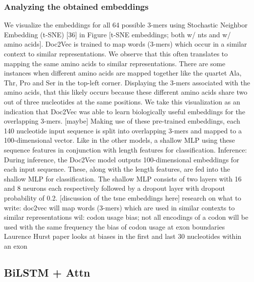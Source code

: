 \subsubsection{Analyzing the obtained embeddings}
We visualize the embeddings for all 64 possible 3-mers using Stochastic Neighbor Embedding (t-SNE) [36] in Figure [t-SNE embeddings; both w/ nts and w/ amino acids].
Doc2Vec is trained to map words (3-mers) which occur in a similar context to similar representations. We observe that this often translates to mapping the same amino acids to similar representations. There are some instances when different amino acids are mapped together like the quartet Ala, Thr, Pro and Ser in the top-left corner. Displaying the 3-mers associated with the amino acids, that this likely occurs because these different amino acids share two out of three nucleotides at the same positions. We take this visualization as an indication that Doc2Vec was able to learn biologically useful embeddings for the overlapping 3-mers.
[maybe] Making use of these pre-trained embeddings, each 140 nucleotide input sequence is split into overlapping 3-mers and mapped to a 100-dimensional vector. Like in the other models, a shallow MLP using these sequence features in conjunction with length features for classification.
Inference:
During inference, the Doc2Vec model outputs 100-dimensional embeddings for each input sequence. These, along with the length features, are fed into the shallow MLP for classification. The shallow MLP consists of two layers with 16 and 8 neurons each respectively followed by a dropout layer with dropout probability of 0.2.
[discussion of the tsne embeddings here]
research on what to write:
doc2vec will map words (3-mers) which are used in similar contexts to similar representations
wil: codon usage bias; not all encodings of a codon will be used with the same frequency
the bias of codon usage at exon boundaries
Laurence Hurst paper looks at biases in the first and last 30 nucleotides within an exon
\subsection{BiLSTM + Attn} \label{subsec:bilstm}
